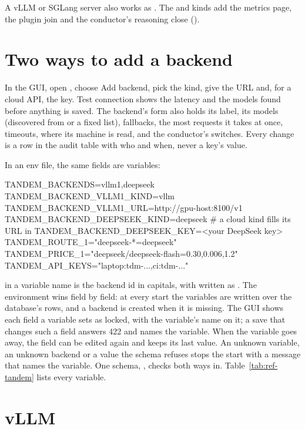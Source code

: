 A vLLM or SGLang server also works as . The  and  kinds add the metrics page, the plugin join and the conductor's reasoning close ().

\section{Two ways to add a backend}

In the GUI, open , choose Add backend, pick the kind, give the URL and, for a cloud API, the key. Test connection shows the latency and the models found before anything is saved. The backend's form also holds its label, its models (discovered from  or a fixed list), fallbacks, the most requests it takes at once, timeouts, where its machine is read, and the conductor's switches. Every change is a row in the audit table with who and when, never a key's value.

In an env file, the same fields are  variables:

\begin{shell}
TANDEM_BACKENDS=vllm1,deepseek
TANDEM_BACKEND_VLLM1_KIND=vllm
TANDEM_BACKEND_VLLM1_URL=http://gpu-host:8100/v1
TANDEM_BACKEND_DEEPSEEK_KIND=deepseek          # a cloud kind fills its URL in
TANDEM_BACKEND_DEEPSEEK_KEY=<your DeepSeek key>
TANDEM_ROUTE_1="deepseek-*=deepseek"
TANDEM_PRICE_1="deepseek/deepseek-flash=0.30,0.006,1.2"
TANDEM_API_KEYS="laptop:tdm-...,ci:tdm-..."
\end{shell}

 in a variable name is the backend id in capitals, with \code{-} written as \code{_}. The environment wins field by field: at every start the variables are written over the database's rows, and a backend is created when it is missing. The GUI shows each field a variable sets as locked, with the variable's name on it; a save that changes such a field answers 422 and names the variable. When the variable goes away, the field can be edited again and keeps its last value. An unknown variable, an unknown backend or a value the schema refuses stops the start with a message that names the variable. One schema, , checks both ways in. Table~\ref{tab:ref-tandem} lists every variable.

\section{vLLM}

